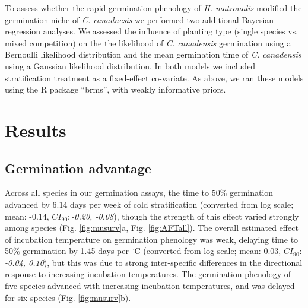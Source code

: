 \documentclass{article}[11pt]
\begin{document}
To assess whether the rapid germination phenology of \textit{H. matronalis} modified the germination niche of \textit{C. canadnesis} we performed two additional Bayesian regression analyses. We assessed the influence of planting type (single species vs. mixed competition) on the the likelihood of \textit{C. canadensis} germination using a Bernoulli likelihood distribution and the mean germination time of \textit{C. canadensis} using a Gaussian likelihood distribution. In both models we included stratification treatment as a fixed-effect co-variate. As above, we ran these models using the R package ``brms''\citep{Burkner2018}, with weakly informative priors.

\section*{Results}
\subsection*{Germination advantage}
Across all species in our germination assays, the time to 50\% germination advanced by 6.14 days per week of cold stratification (converted from log scale; mean: -0.14, $CI_{90}:$\textit{-0.20, -0.08}), though the strength of this effect varied strongly among species  (Fig. \ref{fig:musurv}a, Fig. \ref{fig:AFTall}). The overall estimated effect of incubation temperature on germination phenology was weak, delaying time to 50\% germination by 1.45 days per $^{\circ}$C (converted from log scale; mean: 0.03, $CI_{90}:$\textit{-0.04, 0.10}), but this was due to strong inter-specific differences in the directional response to increasing incubation temperatures. The germination phenology of five species advanced with increasing incubation temperatures, and was delayed for six species (Fig. \ref{fig:musurv}b).%
\end{document}

